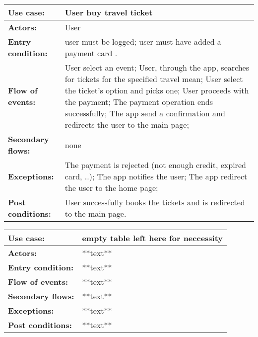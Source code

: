 	\begin{table}[h!]
	\begin{tabu} to \textwidth {| X[\fcWidth,r,p] | X[1-\fcWidth,l,p] |}
		\hline\textbf{Use case:} & User buy travel ticket
		\\
		\hline\textbf{Actors:} & User
		\\
		\hline\textbf{Entry condition:} & user must be logged; \newline
		user must have added a payment card .
		
		\\
		\hline\textbf{Flow of events:} &User select an event;\newline
		User,  through the app, searches for tickets for the specified travel mean; \newline
		User select the ticket’s option and picks one;\newline
		User proceeds with the payment;\newline
		The payment operation ends successfully;\newline
		The app send a confirmation and redirects the user to the main page;
		
		\\
		\hline\textbf{Secondary flows:} & none
		\\
		\hline\textbf{Exceptions:} & The payment is rejected (not enough credit, expired card, ..);\newline
		The app notifies the user; \newline
		The app redirect the user to the home page;
		
		\\
		\hline\textbf{Post conditions:} & User successfully books the tickets and is redirected to the main page.
		\\
		\hline
	\end{tabu}
\end{table}
	\begin{table}[h!]
	\begin{tabu} to \textwidth {| X[\fcWidth,r,p] | X[1-\fcWidth,l,p] |}
		\hline\textbf{Use case:} & empty table left here for neccessity
		\\
		\hline\textbf{Actors:} & **text**
		\\
		\hline\textbf{Entry condition:} & **text**
		\\
		\hline\textbf{Flow of events:} & **text**
		\\
		\hline\textbf{Secondary flows:} & **text**
		\\
		\hline\textbf{Exceptions:} & **text**
		\\
		\hline\textbf{Post conditions:} & **text**
		\\
		\hline
	\end{tabu}
\end{table}
